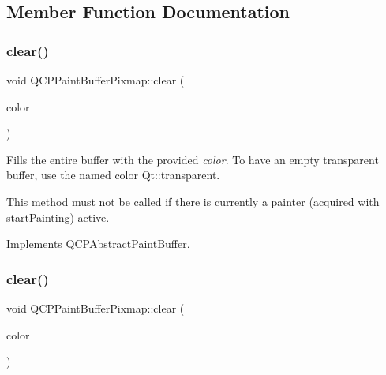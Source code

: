 \subsection{Member Function Documentation}
\mbox{\label{class_q_c_p_paint_buffer_pixmap_a14badbd010a3cde6b55817ccb7b65217}} 
\subsubsection{\texorpdfstring{clear()}{clear()}\hspace{0.1cm}{\footnotesize\ttfamily [1/2]}}
{\footnotesize\ttfamily void Q\+C\+P\+Paint\+Buffer\+Pixmap\+::clear (\begin{DoxyParamCaption}\item[{const Q\+Color \&}]{color }\end{DoxyParamCaption})\hspace{0.3cm}{\ttfamily [virtual]}}

Fills the entire buffer with the provided {\itshape color}. To have an empty transparent buffer, use the named color {\ttfamily Qt\+::transparent}.

This method must not be called if there is currently a painter (acquired with \hyperlink{class_q_c_p_paint_buffer_pixmap_a357964ef7d28cfa530338be4e5c93234}{start\+Painting}) active. 

Implements \hyperlink{class_q_c_p_abstract_paint_buffer_a9e253f4541dfc01992b77e8830bd7722}{Q\+C\+P\+Abstract\+Paint\+Buffer}.

\mbox{\label{class_q_c_p_paint_buffer_pixmap_a14badbd010a3cde6b55817ccb7b65217}} 
\subsubsection{\texorpdfstring{clear()}{clear()}\hspace{0.1cm}{\footnotesize\ttfamily [2/2]}}
{\footnotesize\ttfamily void Q\+C\+P\+Paint\+Buffer\+Pixmap\+::clear (\begin{DoxyParamCaption}\item[{const Q\+Color \&}]{color }\end{DoxyParamCaption})\hspace{0.3cm}{\ttfamily [virtual]}}

